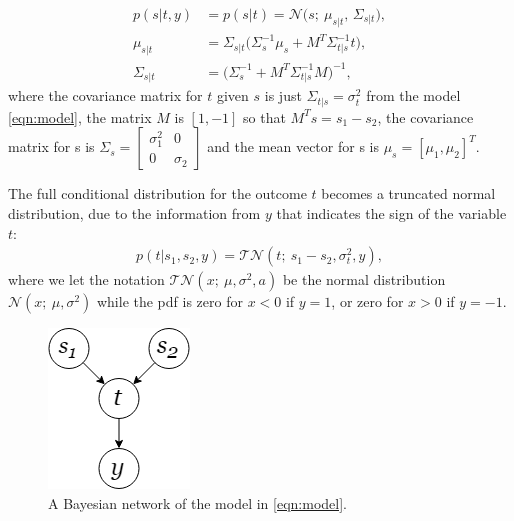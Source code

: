 \documentclass{article}
\begin{document}
	\begin{subequations}
	\begin{align}
		p(s | t, y) &= p(s | t) = \mathcal{N}\Big( s;~\mu_{s|t},\,\Sigma_{s|t} \Big),\\
		\mu_{s|t} &= \Sigma_{s|t}\Big(\Sigma_s^{-1} \mu_s + M^T\Sigma_{t|s}^{-1}t\Big),\\
		\Sigma_{s|t} &= \Big( \Sigma_s^{-1} + M^T\Sigma_{t|s}^{-1}M \Big)^{-1},
	\end{align}
	\end{subequations}
	where the covariance matrix for $t$ given $s$ is just $\Sigma_{t|s}=\sigma_t^2$ from the model \eqref{eqn:model}, the matrix $M$ is $[1, -1]$ so that $M^Ts = s_1 - s_2$, the covariance matrix for s is $\Sigma_s = \begin{bmatrix}
	\sigma_1^2 & 0\\ 0 & \sigma_2 \end{bmatrix}$ and the mean vector for s is $\mu_s = [\mu_1, \mu_2]^T$.
	
	The full conditional distribution for the outcome $t$ becomes a truncated normal distribution, due to the information from $y$ that indicates the sign of the variable $t$:
	\begin{align}
	p(t|s_1, s_2, y) = \mathcal{TN}(t;~s_1-s_2, \sigma_t^2, y),
	\end{align}
	where we let the notation $\mathcal{TN}(x;~\mu, \sigma^2, a)$ be the normal distribution $\mathcal{N}(x;~\mu, \sigma^2)$ while the pdf is zero for $ x<0 $ if $ y=1 $, or zero for $ x>0 $ if $ y=-1 $.
	
	\begin{figure}
		\includegraphics[width=\linewidth]{bayes4}
		\caption{A Bayesian network of the model in \eqref{eqn:model}.}
		\label{fig:bayes_n}
	\end{figure}
	
\end{document}

